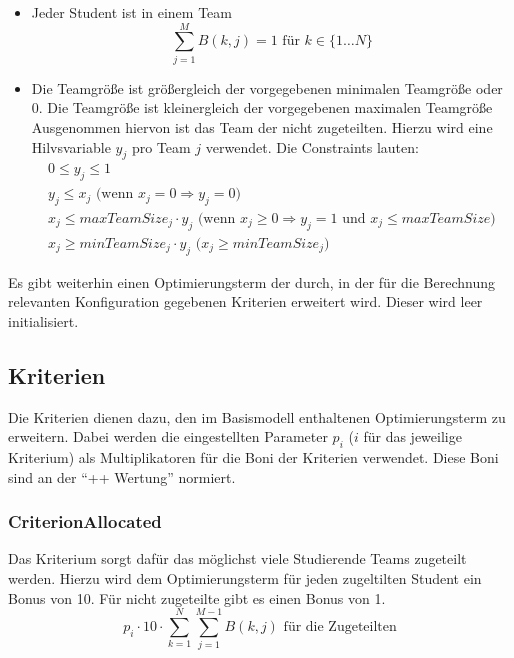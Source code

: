 \documentclass[parskip=full]{scrartcl}
\begin{document}
 \begin{itemize}
   \item Jeder Student ist in einem Team \begin{equation*}
   \sum_{j = 1}^{M} B(k,j) = 1 \text{ für } k \in \{ 1\ldots N \}
   \end{equation*}
   \item Die Teamgröße ist größergleich der vorgegebenen minimalen Teamgröße
   oder 0. Die Teamgröße ist kleinergleich der vorgegebenen maximalen Teamgröße
   Ausgenommen hiervon ist das Team der nicht zugeteilten. Hierzu wird eine
   Hilvsvariable $y_j$ pro Team $j$ verwendet. Die Constraints lauten:
   \begin{gather*}
    0 \le y_j \le 1\\
     y_j \le x_j\text{ (wenn } x_j = 0 \Rightarrow y_j = 0
    \text{)} \\ 
    x_j \le maxTeamSize_j \cdot y_j \text{ (wenn } x_j \geq 0 \Rightarrow y_j
    = 1 \text{ und } x_j \le maxTeamSize \text{)} \\
    x_j \ge minTeamSize_j \cdot y_j \text{ (} x_j \ge minTeamSize_j \text{)}
   \end{gather*}
 \end{itemize}
 
 Es gibt weiterhin einen Optimierungsterm der durch, in der für die Berechnung
 relevanten Konfiguration gegebenen Kriterien erweitert wird. Dieser wird leer
 initialisiert.

\subsection{Kriterien}
Die Kriterien dienen dazu, den im Basismodell enthaltenen Optimierungsterm zu
erweitern. Dabei werden die eingestellten Parameter $p_i$ ($i$ für das
jeweilige Kriterium) als Multiplikatoren für die Boni der Kriterien verwendet.
Diese Boni sind an der \enquote{++ Wertung} normiert. 

\subsubsection{CriterionAllocated}
Das Kriterium sorgt dafür das möglichst viele Studierende Teams zugeteilt
werden. Hierzu wird dem Optimierungsterm für jeden zugeltilten Student ein Bonus
von 10. Für nicht zugeteilte gibt es einen Bonus von 1. \begin{equation*}
p_i \cdot 10 \cdot \sum_{k = 1}^{N} \sum_{j = 1}^{M-1} B(k,j) \text{ für die
Zugeteilten}
\end{equation*}
\end{document}
